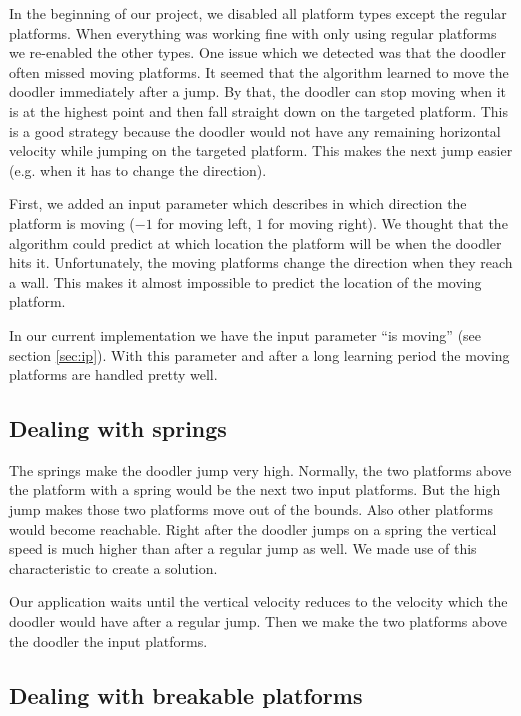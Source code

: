 \documentclass[a4paper,12pt,pagesize,headsepline,bibtotoc,titlepage,abstracton]{scrartcl}
\begin{document}
In the beginning of our project, we disabled all platform types except the regular platforms. When everything was working fine with only using regular platforms we re-enabled the other types. One issue which we detected was that the doodler often missed moving platforms. It seemed that the algorithm learned to move the doodler immediately after a jump. By that, the doodler can stop moving when it is at the highest point and then fall straight down on the targeted platform. This is a good strategy because the doodler would not have any remaining horizontal velocity while jumping on the targeted platform. This makes the next jump easier (e.g. when it has to change the direction).

First, we added an input parameter which describes in which direction the platform is moving ($-1$ for moving left, $1$ for moving right). We thought that the algorithm could predict at which location the platform will be when the doodler hits it. Unfortunately, the moving platforms change the direction when they reach a wall. This makes it almost impossible to predict the location of the moving platform.

In our current implementation we have the input parameter ``is moving'' (see section \ref{sec:ip}). With this parameter and after a long learning period the moving platforms are handled pretty well.

\subsection{Dealing with springs}

The springs make the doodler jump very high. Normally, the two platforms above the platform with a spring would be the next two input platforms. But the high jump makes those two platforms move out of the bounds. Also other platforms would become reachable. Right after the doodler jumps on a spring the vertical speed is much higher than after a regular jump as well. We made use of this characteristic to create a solution.

Our application waits until the vertical velocity reduces to the velocity which the doodler would have after a regular jump. Then we make the two platforms above the doodler the input platforms.

\subsection{Dealing with breakable platforms}
\end{document}
